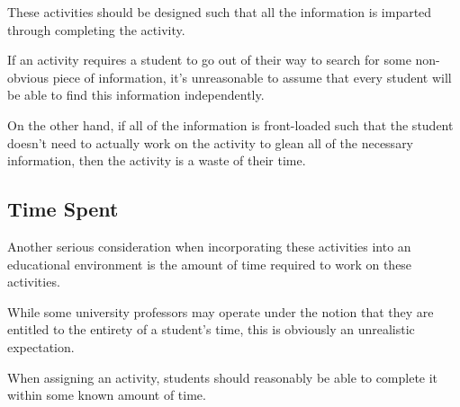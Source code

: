 These activities should be designed such that all the information is imparted through completing the activity. %







If an activity requires a student to go out of their way to search for some non-obvious piece of information, it's unreasonable to assume that every student will be able to find this information independently. %







On the other hand, if all of the information is front-loaded such that the student doesn't need to actually work on the activity to glean all of the necessary information, then the activity is a waste of their time. 















        







    \subsection{Time Spent}







        Another serious consideration when incorporating these activities into an educational environment is the amount of time required to work on these activities. %







While some university professors may operate under the notion that they are entitled to the entirety of a student's time, this is obviously an unrealistic expectation. %







When assigning an activity, students should reasonably be able to complete it within some known amount of time. 







